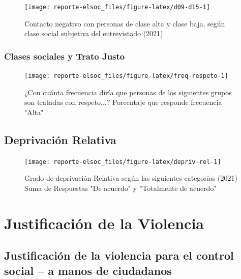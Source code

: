 \documentclass[
  12pt,
  openany]{book}
\begin{document}
\begin{figure}

{\centering \texttt{[image: reporte-elsoc\_files/figure-latex/d09-d15-1]} 

}

\caption{Contacto negativo con personas de clase alta y clase baja, según clase social subjetiva del entrevistado (2021)}\label{fig:d09-d15}
\end{figure}

\hypertarget{clases-sociales-y-trato-justo}{%
\subsection{Clases sociales y Trato Justo}\label{clases-sociales-y-trato-justo}}

\begin{figure}

{\centering \texttt{[image: reporte-elsoc\_files/figure-latex/freq-respeto-1]} 

}

\caption{¿Con cuánta frecuencia diría que personas de los siguientes grupos son tratadas con respeto...? Porcentaje que responde frecuencia "Alta"}\label{fig:freq-respeto}
\end{figure}

\hypertarget{deprivaciuxf3n-relativa}{%
\section{Deprivación Relativa}\label{deprivaciuxf3n-relativa}}

\begin{figure}

{\centering \texttt{[image: reporte-elsoc\_files/figure-latex/depriv-rel-1]} 

}

\caption{Grado de deprivación Relativa según las siguientes categorías (2021) Suma de Respuestas "De acuerdo" y ”Totalmente de acuerdo"}\label{fig:depriv-rel}
\end{figure}

\hypertarget{justificaciuxf3n-de-la-violencia}{%
\chapter{Justificación de la Violencia}\label{justificaciuxf3n-de-la-violencia}}

\hypertarget{justificaciuxf3n-de-la-violencia-para-el-control-social-a-manos-de-ciudadanos}{%
\section{Justificación de la violencia para el control social -- a manos de ciudadanos}\label{justificaciuxf3n-de-la-violencia-para-el-control-social-a-manos-de-ciudadanos}}
\end{document}
